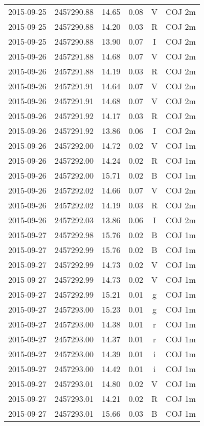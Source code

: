 \begin{table}
\begin{tabular}{cccccc}
2015-09-25 & 2457290.88 & 14.65 & 0.08 & V & COJ 2m \\
2015-09-25 & 2457290.88 & 14.20 & 0.03 & R & COJ 2m \\
2015-09-25 & 2457290.88 & 13.90 & 0.07 & I & COJ 2m \\
2015-09-26 & 2457291.88 & 14.68 & 0.07 & V & COJ 2m \\
2015-09-26 & 2457291.88 & 14.19 & 0.03 & R & COJ 2m \\
2015-09-26 & 2457291.91 & 14.64 & 0.07 & V & COJ 2m \\
2015-09-26 & 2457291.91 & 14.68 & 0.07 & V & COJ 2m \\
2015-09-26 & 2457291.92 & 14.17 & 0.03 & R & COJ 2m \\
2015-09-26 & 2457291.92 & 13.86 & 0.06 & I & COJ 2m \\
2015-09-26 & 2457292.00 & 14.72 & 0.02 & V & COJ 1m \\
2015-09-26 & 2457292.00 & 14.24 & 0.02 & R & COJ 1m \\
2015-09-26 & 2457292.00 & 15.71 & 0.02 & B & COJ 1m \\
2015-09-26 & 2457292.02 & 14.66 & 0.07 & V & COJ 2m \\
2015-09-26 & 2457292.02 & 14.19 & 0.03 & R & COJ 2m \\
2015-09-26 & 2457292.03 & 13.86 & 0.06 & I & COJ 2m \\
2015-09-27 & 2457292.98 & 15.76 & 0.02 & B & COJ 1m \\
2015-09-27 & 2457292.99 & 15.76 & 0.02 & B & COJ 1m \\
2015-09-27 & 2457292.99 & 14.73 & 0.02 & V & COJ 1m \\
2015-09-27 & 2457292.99 & 14.73 & 0.02 & V & COJ 1m \\
2015-09-27 & 2457292.99 & 15.21 & 0.01 & g & COJ 1m \\
2015-09-27 & 2457293.00 & 15.23 & 0.01 & g & COJ 1m \\
2015-09-27 & 2457293.00 & 14.38 & 0.01 & r & COJ 1m \\
2015-09-27 & 2457293.00 & 14.37 & 0.01 & r & COJ 1m \\
2015-09-27 & 2457293.00 & 14.39 & 0.01 & i & COJ 1m \\
2015-09-27 & 2457293.00 & 14.42 & 0.01 & i & COJ 1m \\
2015-09-27 & 2457293.01 & 14.80 & 0.02 & V & COJ 1m \\
2015-09-27 & 2457293.01 & 14.21 & 0.02 & R & COJ 1m \\
2015-09-27 & 2457293.01 & 15.66 & 0.03 & B & COJ 1m \\

\end{tabular}
\end{table}
